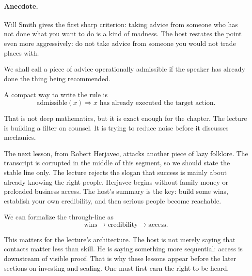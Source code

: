 \paragraph{Anecdote.}
Will Smith gives the first sharp criterion: taking advice from someone who has not done what you want to do is a kind of madness. The host restates the point even more aggressively: do not take advice from someone you would not trade places with.

\begin{definition}
We shall call a piece of advice operationally admissible if the speaker has already done the thing being recommended.
\end{definition}

A compact way to write the rule is
\begin{equation}
\mathrm{admissible}(x) \Rightarrow x \text{ has already executed the target action.}
\end{equation}

That is not deep mathematics, but it is exact enough for the chapter. The lecture is building a filter on counsel. It is trying to reduce noise before it discusses mechanics.

The next lesson, from Robert Herjavec, attacks another piece of lazy folklore. The transcript is corrupted in the middle of this segment, so we should state the stable line only. The lecture rejects the slogan that success is mainly about already knowing the right people. Herjavec begins without family money or preloaded business access. The host's summary is the key: build some wins, establish your own credibility, and then serious people become reachable.

We can formalize the through-line as
\begin{equation}
\text{wins} \longrightarrow \text{credibility} \longrightarrow \text{access}.
\end{equation}

\begin{figure}[h]
\centering
{}
\end{figure}

This matters for the lecture's architecture. The host is not merely saying that contacts matter less than skill. He is saying something more sequential: access is downstream of visible proof. That is why these lessons appear before the later sections on investing and scaling. One must first earn the right to be heard.


